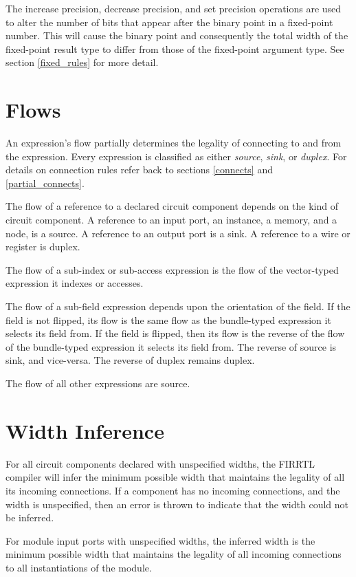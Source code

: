 \documentclass[12pt]{article}
\begin{document}
The increase precision, decrease precision, and set precision operations are used to alter the
number of bits that appear after the binary point in a fixed-point number. This will cause the
binary point and consequently the total width of the fixed-point result type to differ from those of
the fixed-point argument type. See section \ref{fixed_rules} for more detail.

\section{Flows}\label{flows}

An expression's flow partially determines the legality of connecting to and from the expression. Every expression is classified as either {\em source}, {\em sink}, or {\em duplex}. For details on connection rules refer back to sections \ref{connects} and \ref{partial_connects}.

The flow of a reference to a declared circuit component depends on the kind of circuit component. A reference to an input port, an instance, a memory, and a node, is a source. A reference to an output port is a sink. A reference to a wire or register is duplex.

The flow of a sub-index or sub-access expression is the flow of the vector-typed expression it indexes or accesses.

The flow of a sub-field expression depends upon the orientation of the field. If the field is not flipped, its flow is the same flow as the bundle-typed expression it selects its field from. If the field is flipped, then its flow is the reverse of the flow of the bundle-typed expression it selects its field from. The reverse of source is sink, and vice-versa. The reverse of duplex remains duplex.

The flow of all other expressions are source.

\section{Width Inference}\label{width_inference}

For all circuit components declared with unspecified widths, the FIRRTL compiler will infer the minimum possible width that maintains the legality of all its incoming connections. If a component has no incoming connections, and the width is unspecified, then an error is thrown to indicate that the width could not be inferred.

For module input ports with unspecified widths, the inferred width is the minimum possible width that maintains the legality of all incoming connections to all instantiations of the module.
\end{document}
